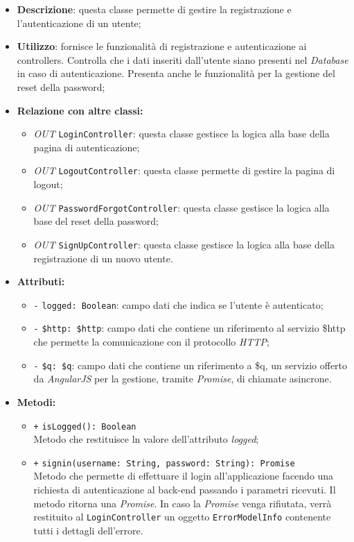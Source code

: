 \begin{itemize}
	\item \textbf{Descrizione}: questa classe permette di gestire la registrazione e l'autenticazione di un utente;
	\item \textbf{Utilizzo}: fornisce le funzionalità di registrazione e autenticazione ai controllers. Controlla che i dati inseriti dall'utente siano presenti nel \textit{Database} in caso di autenticazione. Presenta anche le funzionalità per la gestione del reset della password;
	\item \textbf{Relazione con altre classi:}
	\begin{itemize}
		\item \textit{OUT} \texttt{LoginController}: questa classe gestisce la logica alla base della pagina di autenticazione;
		\item \textit{OUT} \texttt{LogoutController}: questa classe permette di gestire la pagina di logout;
		\item \textit{OUT} \texttt{PasswordForgotController}: questa classe gestisce la logica alla base del reset della password;
		\item \textit{OUT} \texttt{SignUpController}: questa classe gestisce la logica alla base della registrazione di un nuovo utente.
	\end{itemize}
	\item \textbf{Attributi:}
	\begin{itemize}
		\item \texttt{-} \texttt{logged: Boolean}: campo dati che indica se l'utente è autenticato;
		\item \texttt{-} \texttt{\$http: \$http}: campo dati che contiene un riferimento al servizio \$http che permette la comunicazione con il protocollo \textit{HTTP};
		\item \texttt{-} \texttt{\$q: \$q}: campo dati che contiene un riferimento a \$q, un servizio offerto da \textit{AngularJS} per la gestione, tramite \textit{Promise}, di chiamate asincrone.
	\end{itemize}
	\item \textbf{Metodi:}
	\begin{itemize}
		\item \texttt{+} \texttt{isLogged(): Boolean} \\ Metodo che restituisce ln valore dell'attributo \textit{logged};
		\item \texttt{+} \texttt{signin(username: String, password: String): Promise}\\ Metodo che permette di effettuare il login all'applicazione facendo una richiesta di autenticazione al back-end passando i parametri ricevuti. Il metodo ritorna una \textit{Promise}. In caso la \textit{Promise} venga rifiutata, verrà restituito al \texttt{LoginController} un oggetto \texttt{ErrorModelInfo} contenente tutti i dettagli dell'errore. \\

\end{itemize}
\end{itemize}
